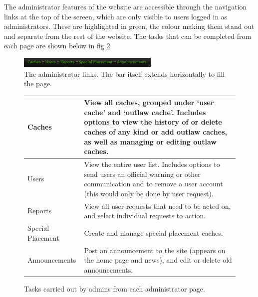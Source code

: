 The administrator features of the website are accessible through the navigation links at the top of the screen, which are only visible to users logged in as administrators. These are highlighted in green, the colour making them stand out and separate from the rest of the website. The tasks that can be completed from each page are shown below in fig \ref{admin_page_tasks}. 
\vspace{55pt}
\begin{figure}[ht]
	\begin{center}
	\includegraphics[width=0.6\textwidth]{images/admin_bar}
	\caption{The administrator links. The bar itself extends horizontally to fill the page.}
	\label{admin_bar}
	\end{center}
\end{figure}
\begin{figure}[ht]
\begin{center}
\begin{tabular}{| p{} | p{} |}
	\hline
	Caches &
	View all caches, grouped under `user cache' and `outlaw cache'. Includes options to view the history of or delete caches of any kind or add outlaw caches, as well as managing or editing outlaw caches. \\
	\hline
	Users &
	View the entire user list. Includes options to send users an official warning or other communication and to remove a user account (this would only be done by user request). \\
	\hline
	Reports &
	View all user requests that need to be acted on, and select individual requests to action. \\
	\hline
	Special Placement &
	Create and manage special placement caches. \\
	\hline
	Announcements &
	Post an announcement to the site (appears on the home page and news), and edit or delete old announcements. \\
	\hline
\end{tabular}
\caption {Tasks carried out by admins from each administrator page.}
\label{admin_page_tasks}
\end{center}
\end{figure}


